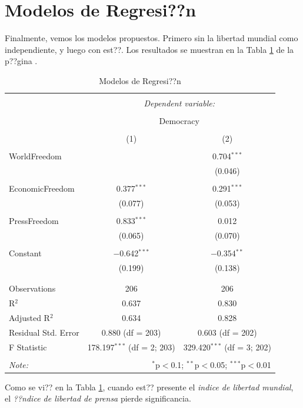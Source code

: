 \section{Modelos de Regresi??n}

Finalmente, vemos los modelos propuestos. Primero sin la libertad mundial como independiente, y luego con est??. Los resultados se muestran en la Tabla \ref{regresiones} de la p??gina \pageref{regresiones}.




\begin{table}[!htbp] \centering 
  \caption{Modelos de Regresi??n} 
  \label{regresiones} 
\begin{tabular}{@{\extracolsep{5pt}}lcc} 
\\[-1.8ex]\hline 
\hline \\[-1.8ex] 
 & \multicolumn{2}{c}{\textit{Dependent variable:}} \\ 
\cline{2-3} 
\\[-1.8ex] & \multicolumn{2}{c}{Democracy} \\ 
\\[-1.8ex] & (1) & (2)\\ 
\hline \\[-1.8ex] 
 WorldFreedom &  & 0.704$^{***}$ \\ 
  &  & (0.046) \\ 
  & & \\ 
 EconomicFreedom & 0.377$^{***}$ & 0.291$^{***}$ \\ 
  & (0.077) & (0.053) \\ 
  & & \\ 
 PressFreedom & 0.833$^{***}$ & 0.012 \\ 
  & (0.065) & (0.070) \\ 
  & & \\ 
 Constant & $-$0.642$^{***}$ & $-$0.354$^{**}$ \\ 
  & (0.199) & (0.138) \\ 
  & & \\ 
\hline \\[-1.8ex] 
Observations & 206 & 206 \\ 
R$^{2}$ & 0.637 & 0.830 \\ 
Adjusted R$^{2}$ & 0.634 & 0.828 \\ 
Residual Std. Error & 0.880 (df = 203) & 0.603 (df = 202) \\ 
F Statistic & 178.197$^{***}$ (df = 2; 203) & 329.420$^{***}$ (df = 3; 202) \\ 
\hline 
\hline \\[-1.8ex] 
\textit{Note:}  & \multicolumn{2}{r}{$^{*}$p$<$0.1; $^{**}$p$<$0.05; $^{***}$p$<$0.01} \\ 
\end{tabular} 
\end{table} 
Como se vi?? en la Tabla \ref{regresiones}, cuando est?? presente el \emph{indice de libertad mundial}, el \emph{??ndice de libertad de prensa} pierde significancia.

